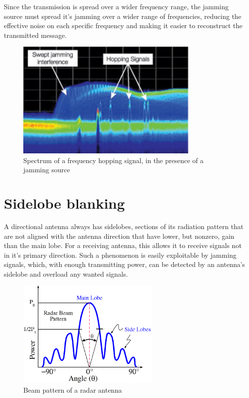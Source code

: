 \documentclass[english,purist]{ist-report}
\begin{document}
Since the transmission is spread over a wider frequency range, the jamming source must spread it's jamming over a wider range of frequencies, reducing the effective noise on each specific frequency and making it easier to reconstruct the transmitted message.

\begin{figure}[ht]
\centering
\includegraphics[width=90mm]{frequency_hopping_jamming.png}
\caption{Spectrum of a frequency hopping signal, in the presence of a jamming source}
\label{frequency_hopping_jamming}
\end{figure} 

\section{Sidelobe blanking}

A directional antenna always has sidelobes, sections of its radiation pattern that are not aligned with the antenna direction that have lower, but nonzero, gain than the main lobe. For a receiving antenna, this allows it to receive signals not in it's primary direction. Such a phenomenon is easily exploitable by jamming signals, which, with enough transmitting power, can be detected by an antenna's sidelobe and overload any wanted signals.

\begin{figure}[ht]
\centering
\includegraphics[width=70mm]{radar_antenna_lobes.png}
\caption{Beam pattern of a radar antenna}
\label{target1}
\end{figure} 
\end{document}
